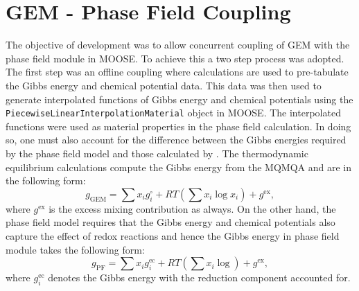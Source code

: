 	\section{GEM - Phase Field Coupling}
The objective of {\YJ} development was to allow concurrent coupling of GEM with the phase field module in MOOSE. To achieve this a two step process was adopted. The first step was an offline coupling where {\GEM} calculations are used to pre-tabulate the Gibbs energy and chemical potential data. This data was then used to generate interpolated functions of Gibbs energy and chemical potentials using the \texttt{PiecewiseLinearInterpolationMaterial} object in MOOSE. The interpolated functions were used as material properties in the phase field calculation. In doing so, one must also account for the difference between the Gibbs energies required by the phase field model and those calculated by {\GEM}. The thermodynamic equilibrium calculations compute the Gibbs energy from the MQMQA and are in the following form:
\begin{equation}
	g_\text{GEM} = \sum x_i g_i^\circ + RT\left( \sum x_i \log{x_i} \right) + g^\text{ex},
\end{equation}
where $g^\text{ex}$ is the excess mixing contribution as always. On the other hand, the phase field model requires that the Gibbs energy and chemical potentials also capture the effect of redox reactions and hence the Gibbs energy in phase field module takes the following form:
\begin{equation}
	g_\text{PF} = \sum x_i g_i^\text{ec}  + RT\left( \sum x_i \log{} \right) + g^\text{ex},
\end{equation}
where $g_i^\text{ec}$ denotes the Gibbs energy with the reduction component accounted for. 

